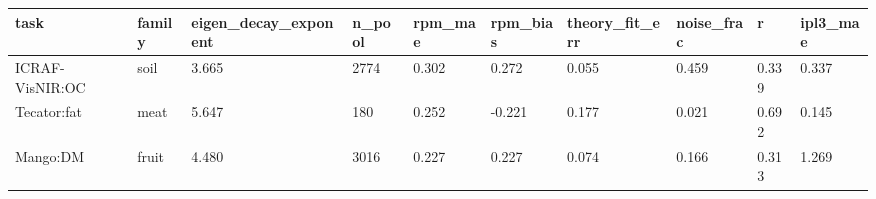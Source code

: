 \begin{tabular}{llllllllll}
\hline
task & family & eigen\_decay\_exponent & n\_pool & rpm\_mae & rpm\_bias & theory\_fit\_err & noise\_frac & r & ipl3\_mae \\
\hline
ICRAF-VisNIR:OC & soil & 3.665 & 2774 & 0.302 & 0.272 & 0.055 & 0.459 & 0.339 & 0.337 \\
Tecator:fat & meat & 5.647 & 180 & 0.252 & -0.221 & 0.177 & 0.021 & 0.692 & 0.145 \\
Mango:DM & fruit & 4.480 & 3016 & 0.227 & 0.227 & 0.074 & 0.166 & 0.313 & 1.269 \\
\hline
\end{tabular}
